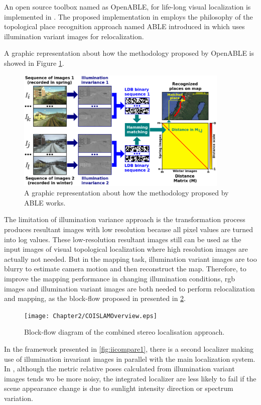 An open source toolbox named as OpenABLE, for life-long visual localization is implemented in \cite{arroyo2016openable}. The proposed implementation in \cite{arroyo2016openable} employs the philosophy of the topological place recognition approach named ABLE introduced in \cite{arroyo2014bidirectional, arroyo2014fast, arroyo2015towards} which uses illumination variant images for relocalization.

A graphic representation about how the methodology proposed by OpenABLE is showed in Figure \ref{fig:openableoverview}.

\begin{figure}[H]
	\centering
	\includegraphics[width=4in]{Chapter2/OPENABLEOverview.eps}
	\caption{A graphic representation about how the methodology proposed by ABLE works.}
	\label{fig:openableoverview} 
\end{figure}

The limitation of illumination variance approach is the transformation process produces resultant images with low resolution because all pixel values are turned into log values. These low-resolution resultant images still can be used as the input images of visual topological localization where high resolution images are actually not needed. But in the mapping task, illumination variant images are too blurry to estimate camera motion and then reconstruct the map. Therefore, to improve the mapping performance in changing illumination conditions, rgb images and illumination variant images are both needed to perform relocalization and mapping, as the block-flow proposed in \cite{mcmanus2014shady} presented in \ref{fig:iioverview}.

\begin{figure}[H]
	\centering
	\texttt{[image: Chapter2/COISLAMOverview.eps]}
	\caption{Block-flow diagram of the combined stereo localisation approach.}
	\label{fig:iioverview} 
\end{figure}

In the framework presented in \ref{fig:iicompare1}, there is a second localizer making use of illumination invariant images in parallel with the main localization system. In \cite{maddern2014illumination}, although the metric relative poses calculated from illumination variant images tends wo be more noisy, the integrated localizer are less likely to fail if the scene appearance change is due to sunlight intensity direction or spectrum variation.
\newpage
